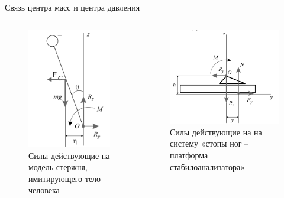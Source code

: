 \documentclass[10pt]{beamer}
\begin{document}
\begin{frame}{Связь центра масс и центра давления}
		\begin{columns}
		\begin{figure}[h!]
			\includegraphics[width=0.7\linewidth]{images_pres/body_1.png}
			\caption{Силы действующие на модель стержня, имитирующего тело человека}
		\end{figure}
		\begin{figure}[h!]
			\includegraphics[width=0.8\linewidth]{images_pres/foot.png}
			\caption{Силы действующие на на систему «стопы ног – платформа стабилоанализатора» }
		\end{figure}
	\end{columns}

\end{frame}
\end{document}

